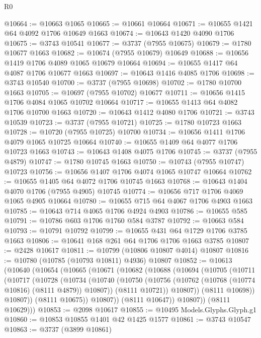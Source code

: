 \begin{lexlean}{R0}
\begin{coremodule}
@10664 := @10663 @1065
@10665 := @10661 @10664
@10671 := @10655 @1421 @64 @4092 @1706 @10649 @1663
@10674 := @10643 @1420 @4090 @1706
@10675 := @3743 @10541
@10677 := @3737 (@7955 @10675)
@10679 := @1780 @10677 @1663
@10682 := @10674 (@7955 @10679) @10649
@10688 := @10656 @1419 @1706 @4089 @1065 @10679 @10664
@10694 := @10655 @1417 @64 @4087 @1706 @10677 @1663
@10697 := @10643 @1416 @4085 @1706
@10698 := @3743 @10540
@10700 := @3737 (@7955 @10698)
@10702 := @1780 @10700 @1663
@10705 := @10697 (@7955 @10702) @10677
@10711 := @10656 @1415 @1706 @4084 @1065 @10702 @10664
@10717 := @10655 @1413 @64 @4082 @1706 @10700 @1663
@10720 := @10643 @1412 @4080 @1706
@10721 := @3743 @10539
@10723 := @3737 (@7955 @10721)
@10725 := @1780 @10723 @1663
@10728 := @10720 (@7955 @10725) @10700
@10734 := @10656 @1411 @1706 @4079 @1065 @10725 @10664
@10740 := @10655 @1409 @64 @4077 @1706 @10723 @1663
@10743 := @10643 @1408 @4075 @1706
@10745 := @3737 (@7955 @4879)
@10747 := @1780 @10745 @1663
@10750 := @10743 (@7955 @10747) @10723
@10756 := @10656 @1407 @1706 @4074 @1065 @10747 @10664
@10762 := @10655 @1405 @64 @4072 @1706 @10745 @1663
@10768 := @10643 @1404 @4070 @1706 (@7955 @4905) @10745
@10774 := @10656 @717 @1706 @4069 @1065 @4905 @10664
@10780 := @10655 @715 @64 @4067 @1706 @4903 @1663
@10785 := @10643 @714 @4065 @1706 @4924 @4903
@10786 := @10655 @585
@10791 := @10786 @603 @1706 @1760 @584 @3787
@10792 := @10663 @584
@10793 := @10791 @10792
@10799 := @10655 @431 @64 @1729 @1706 @3785 @1663
@10806 := @10641 @168 @261 @64 @1706 @1706 @1663 @3785
@10807 := @2428 @10617
@10811 := @10799 (@10806 @10807 @4014) @10807
@10816 := @10780 (@10785 (@10793 @10811) @4936) @10807
@10852 := @10613
    (@10640
      (@10654
        (@10665
          (@10671
            (@10682
              (@10688
                (@10694
                  (@10705
                    (@10711
                      (@10717
                        (@10728
                          (@10734
                            (@10740
                              (@10750
                                (@10756 (@10762 (@10768 (@10774 @10816) (@8111 @4879)) @10807))
                                (@8111 @10721))
                              @10807))
                          (@8111 @10698))
                        @10807))
                    (@8111 @10675))
                  @10807))
              (@8111 @10647))
            @10807))
        (@8111 @10629)))
@10853 := @2098 @10617
@10855 := @10495 Models.Glyphs.Glyph.g1
@10860 := @10853 @10855 @1401 @42 @1425 @1577
@10861 := @3743 @10547
@10863 := @3737 (@3899 @10861)

\end{coremodule}
\end{lexlean}
